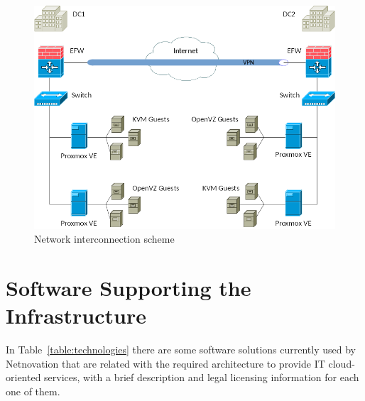 \documentclass[a4paper, 12pt]{book}
\begin{document}
\begin{figure}[H]
  \centering
  \includegraphics[scale=1.80]{network_scheme.png}
  \caption[Network interconnection scheme]{Network interconnection scheme}
  \label{fig:network}
\end{figure}

\vspace{1cm}

\section{Software Supporting the Infrastructure}
\label{sec:software}

In Table~\ref{table:technologies} there are some software solutions currently used by Netnovation that are related with the required architecture to provide IT cloud-oriented services, with a brief description and legal licensing information for each one of them.
\end{document}
